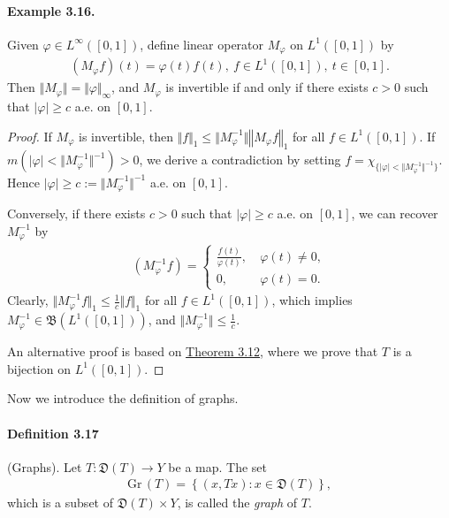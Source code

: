 \documentclass{article}
\newcommand{\Gr}{\mathrm{Gr}\,}
\begin{document}
\paragraph{Example 3.16.} Given $\varphi\in L^\infty([0,1])$, define linear operator $M_\varphi$ on $L^1([0,1])$ by
\begin{align*}
	(M_\varphi f)(t) = \varphi(t) f(t),\ f\in L^1([0,1]),\ t\in[0,1]. 
\end{align*}
Then $\Vert M_\varphi\Vert = \Vert\varphi\Vert_\infty$, and $M_\varphi$ is invertible if and only if there exists $c>0$ such that $\vert\varphi\vert \geq c$ a.e. on $[0,1]$.
\begin{proof}
If $M_\varphi$ is invertible, then $\Vert f\Vert_1\leq\Vert M_\varphi^{-1}\Vert\left\Vert M_\varphi f\right\Vert_1$ for all $f\in L^1([0,1])$. If $m(\vert\varphi\vert < \Vert M_\varphi^{-1}\Vert^{-1}) > 0$, we derive a contradiction by setting $f=\chi_{\{\vert\varphi\vert < \Vert M_\varphi^{-1}\Vert^{-1}\}}$. Hence $\vert\varphi\vert\geq c:=\Vert M_\varphi^{-1}\Vert^{-1}$ a.e. on $[0,1]$.

Conversely, if there exists $c>0$ such that $\vert\varphi\vert \geq c$ a.e. on $[0,1]$, we can recover $M_\varphi^{-1}$ by
\begin{align*}
	(M_\varphi^{-1}f) = \begin{cases}
		\frac{f(t)}{\varphi(t)},\ &\varphi(t)\neq 0,\\
		0,\ &\varphi(t)=0.
	\end{cases}
\end{align*}
Clearly, $\Vert M^{-1}_\varphi f\Vert_1\leq \frac{1}{c}\Vert f\Vert_1$ for all $f\in L^1([0,1])$, which implies $M_\varphi^{-1}\in\mathfrak{B}(L^1([0,1]))$, and $\Vert M_\varphi^{-1}\Vert\leq\frac{1}{c}$.\vspace{0.1cm}

An alternative proof is based on \hyperref[thm:3.12]{Theorem 3.12}, where we prove that $T$ is a bijection on $L^1([0,1])$.
\end{proof}

Now we introduce the definition of graphs.
\paragraph{Definition 3.17\label{def:3.17}} (Graphs). Let $T:\mathfrak{D}(T)\to Y$ be a map. The set
\begin{align*}
	\Gr(T)=\left\{(x,Tx):x\in \mathfrak{D}(T)\right\},
\end{align*}
which is a subset of $\mathfrak{D}(T)\times Y$, is called the \textit{graph} of $T$.
\end{document}
